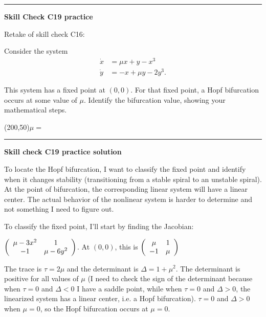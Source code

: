 \documentclass[12pt,letterpaper,noanswers]{exam}
\begin{document}
\vspace{0.2cm}

\hrule
\vspace{0.2cm}

\noindent\textbf{Skill Check C19 practice}
\begin{questions}
\item Retake of skill check C16: 


\item Consider the system 
\begin{align*}
\dot x &= \mu x + y - x^3 \\
\dot y &= -x+\mu y - 2y^3.
\end{align*}

This system has a fixed point at $(0, 0)$.  For that fixed point, a Hopf bifurcation occurs at some value of $\mu$.  Identify the bifurcation value, showing your mathematical steps.


\end{questions}

\framebox(200,50){\quad $\mu=$  \hfill}

\vspace{0.2cm}

\hrule
\vspace{0.2cm}

\noindent\textbf{Skill check C19 practice solution}

To locate the Hopf bifurcation, I want to classify the fixed point and identify when it changes stability (transitioning from a stable spiral to an unstable spiral).  At the point of bifurcation, the corresponding linear system will have a linear center.  The actual behavior of the nonlinear system is harder to determine and not something I need to figure out.

To classify the fixed point, I'll start by finding the Jacobian:

$\left(\begin{array}{c c} \mu - 3x^2 & 1 \\ -1 & \mu - 6y^2  \end{array}\right)$. At $(0,0)$, this is $\left(\begin{array}{c c} \mu  & 1 \\ -1 & \mu  \end{array}\right)$

The trace is $\tau = 2\mu$ and the determinant is $\Delta = 1+\mu^2$.  The determinant is positive for all values of $\mu$ (I need to check the sign of the determinant because when $\tau = 0$ and $\Delta < 0$ I have a saddle point, while when $\tau = 0$ and $\Delta > 0$, the linearized system has a linear center, i.e. a Hopf bifurcation).  $\tau = 0$ and $\Delta>0$ when $\mu = 0$, so the Hopf bifurcation occurs at $\mu = 0$. 
\end{document}
